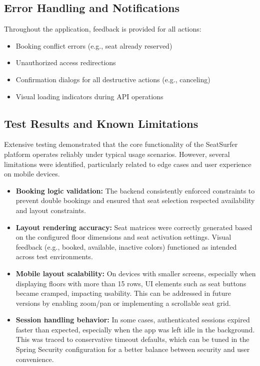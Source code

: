 \documentclass[12pt,a4paper]{report} %
\begin{document}
\subsection*{Error Handling and Notifications}

Throughout the application, feedback is provided for all actions:
\begin{itemize}
    \item Booking conflict errors (e.g., seat already reserved)
    \item Unauthorized access redirections
    \item Confirmation dialogs for all destructive actions (e.g., canceling)
    \item Visual loading indicators during API operations
\end{itemize}

\subsection{Test Results and Known Limitations}

Extensive testing demonstrated that the core functionality of the SeatSurfer platform operates reliably under typical usage scenarios. However, several limitations were identified, particularly related to edge cases and user experience on mobile devices.

\begin{itemize}
    \item \textbf{Booking logic validation:} The backend consistently enforced constraints to prevent double bookings and ensured that seat selection respected availability and layout constraints.
    
    \item \textbf{Layout rendering accuracy:} Seat matrices were correctly generated based on the configured floor dimensions and seat activation settings. Visual feedback (e.g., booked, available, inactive colors) functioned as intended across test environments.

    \item \textbf{Mobile layout scalability:} On devices with smaller screens, especially when displaying floors with more than 15 rows, UI elements such as seat buttons became cramped, impacting usability. This can be addressed in future versions by enabling zoom/pan or implementing a scrollable seat grid.

    \item \textbf{Session handling behavior:} In some cases, authenticated sessions expired faster than expected, especially when the app was left idle in the background. This was traced to conservative timeout defaults, which can be tuned in the Spring Security configuration for a better balance between security and user convenience.
\end{itemize}
\end{document}
